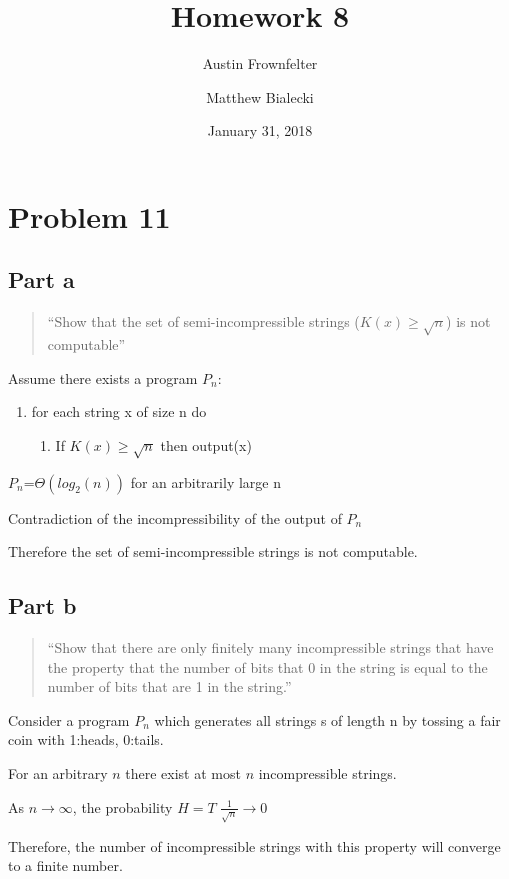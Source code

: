 \documentclass{article}
\title{Homework 8}
\author{Austin Frownfelter \and Matthew Bialecki}
\date{January 31, 2018}
\begin{document}
\maketitle

\section{Problem 11}
\subsection{Part a}
\begin{quote}
``Show that the set of semi-incompressible strings (\(K(x)\geq \sqrt{n}\)) is not computable''
\end{quote}

Assume there exists a program $P_{n}$:
\begin{enumerate}[label=]
\item for each string x of size n do
\begin{enumerate}[label=]
\item If $K(x)\geq \sqrt{n}$ then output(x)
\end{enumerate}
\end{enumerate}

$P_{n}$=$\Theta (log_{2}(n))$ for an arbitrarily large n

Contradiction of the incompressibility of the output of $P_{n}$

Therefore the set of semi-incompressible strings is not computable.

\subsection{Part b}
\begin{quote}
``Show that there are only finitely many incompressible strings that have the property that the number of bits that 0 in the string is equal to the number of bits that are 1 in the string.''
\end{quote}

Consider a program $P_{n}$ which generates all strings s of length n by tossing a fair coin with 1:heads, 0:tails.

For an arbitrary $n$ there exist at most $n$ incompressible strings.

As $n\rightarrow \infty$, the probability $H=T$ $\frac{1}{\sqrt{n}}\rightarrow0$

Therefore, the number of incompressible strings with this property will converge to a finite number.
\end{document}
